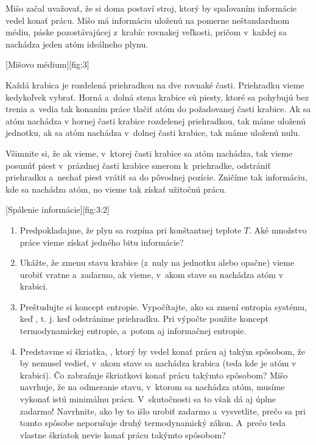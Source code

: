 Mišo začal uvažovať, že si doma postaví stroj, ktorý by spaľovaním informácie vedel konať prácu.
Mišo má informáciu uloženú na pomerne neštandardnom médiu, páske pozostávajúcej z~krabíc rovnakej veľkosti,
pričom v~každej sa nachádza jeden atóm ideálneho plynu.

[Mišovo médium][fig:3]

Každá krabica je rozdelená priehradkou na dve rovnaké časti. Priehradku vieme kedykoľvek vybrať.
Horná a~dolná stena krabice sú piesty, ktoré sa pohybujú bez trenia a~vedia tak konaním práce tlačiť
atóm do požadovanej časti krabice. Ak sa atóm nachádza v hornej časti krabice rozdelenej priehradkou,
tak máme uloženú jednotku, ak sa atóm nachádza v~dolnej časti krabice, tak máme uloženú nulu. 
 
Všimnite si, že ak vieme, v~ktorej časti krabice sa atóm nachádza, tak vieme posunúť piest v~prázdnej
časti krabice smerom k~priehradke, odstrániť priehradku a~nechať piest vrátiť sa do pôvodnej pozície.
Zničíme tak informáciu, kde sa nachádza atóm, no vieme tak získať užitočnú prácu.

[Spálenie informácie][fig:3:2]

\begin{enumerate}[label=\alph*)]
	\item Predpokladajme, že plyn sa rozpína pri konštantnej teplote $T$.
		Aké množstvo práce vieme získať  jedného bitu informácie?
	\item Ukážte, že zmenu stavu krabice (z~nuly na jednotku alebo opačne) vieme urobiť vratne a~zadarmo,
		ak vieme, v~akom stave sa nachádza atóm v krabici.
	\item Preštudujte si koncept entropie. Vypočítajte, ako sa zmení entropia systému,
		keď , t. j. keď odstránime priehradku. Pri výpočte použite koncept
		termodynamickej entropie, a~potom aj informačnej entropie.
	\item Predstavme si škriatka, , ktorý by vedel konať prácu aj takým spôsobom,
		že by nemusel vedieť, v~akom stave sa nachádza krabica (teda kde je atóm v krabici).
		Čo zabraňuje škriatkovi konať prácu takýmto spôsobom? Mišo navrhuje, že na odmeranie stavu,
		v~ktorom sa nachádza atóm, musíme vykonať istú minimálnu prácu. V~skutočnosti sa to však dá aj úplne zadarmo!
		Navrhnite, ako by to išlo urobiť zadarmo a~vysvetlite, prečo sa pri tomto spôsobe neporušuje druhý
		termodynamický zákon. A~prečo teda vlastne škriatok nevie konať prácu takýmto spôsobom?
\end{enumerate}
